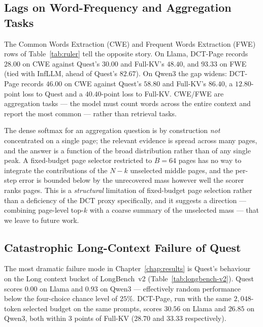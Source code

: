 \subsection{Lags on Word-Frequency and Aggregation Tasks}\label{sec:lags-aggregation}

The Common Words Extraction (CWE) and Frequent Words Extraction (FWE)
rows of Table~\ref{tab:ruler} tell the opposite story.  On Llama,
DCT-Page records $28.00$ on CWE against Quest's $30.00$ and Full-KV's
$48.40$, and $93.33$ on FWE (tied with InfLLM, ahead of Quest's
$82.67$).  On Qwen3 the gap widens: DCT-Page records $46.00$ on CWE
against Quest's $58.80$ and Full-KV's $86.40$, a $12.80$-point loss to
Quest and a $40.40$-point loss to Full-KV.  CWE/FWE are aggregation
tasks --- the model must count words across the entire context and
report the most common --- rather than retrieval tasks.

The dense softmax for an aggregation question is by construction
\emph{not} concentrated on a single page; the relevant evidence is
spread across many pages, and the answer is a function of the broad
distribution rather than of any single peak.  A fixed-budget page
selector restricted to $B{=}64$ pages has no way to integrate the
contributions of the $N - k$ unselected middle pages, and the
per-step error is bounded below by the unrecovered mass however well
the scorer ranks pages.  This is a \emph{structural} limitation of
fixed-budget page selection rather than a deficiency of the DCT
proxy specifically, and it suggests a direction --- combining
page-level top-$k$ with a coarse summary of the unselected mass ---
that we leave to future work.

\subsection{Catastrophic Long-Context Failure of Quest}\label{sec:quest-collapse}

The most dramatic failure mode in Chapter~\ref{chap:results} is
Quest's behaviour on the Long context bucket of LongBench~v2
(Table~\ref{tab:longbench-v2}).  Quest scores $0.00$ on Llama and
$0.93$ on Qwen3 --- effectively random performance below the
four-choice chance level of $25\%$.  DCT-Page, run with the same
$2{,}048$-token selected budget on the same prompts, scores $30.56$
on Llama and $26.85$ on Qwen3, both within $3$ points of Full-KV
($28.70$ and $33.33$ respectively).

